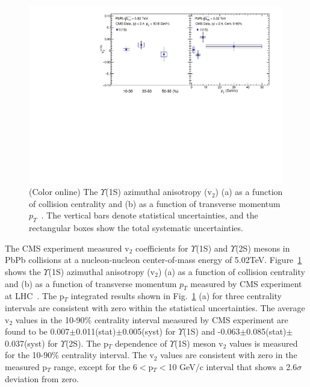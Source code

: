 \begin{figure}
\includegraphics[width=0.99\textwidth]{Figures/ExpOverview/Fig_CMS_Y1S_5TeV_V2.pdf}
\caption{(Color online) The $\Upsilon$(1S) azimuthal anisotropy (v$_{2}$) (a) as a function of collision centrality and 
  (b) as a function of transverse momentum $p_{T}$~\cite{CMS:2020efs}. The vertical bars denote statistical uncertainties,
  and the rectangular boxes show the total systematic uncertainties.
}
\label{fig:Upsilon1SV2CMS}
\end{figure}



The CMS experiment measured v$_{2}$ coefficients for $\Upsilon$(1S) and $\Upsilon$(2S) mesons in PbPb collisions
at a nucleon-nucleon center-of-mass energy of 5.02TeV. Figure~\ref{fig:Upsilon1SV2CMS} shows the $\Upsilon$(1S) azimuthal
anisotropy (v$_{2}$) (a) as a function of collision centrality and (b) as a function of transverse momentum $p_{T}$ measured
by CMS experiment at LHC~\cite{CMS:2020efs}. The p$_{T}$ integrated results
shown in Fig.~\ref{fig:Upsilon1SV2CMS} (a) for three centrality intervals are consistent with zero within the statistical
uncertainties. The average v$_{2}$ values in the 10-90$\%$ centrality interval measured by CMS experiment are found to
be 0.007$\pm$0.011(stat)$\pm$0.005(syst) for $\Upsilon$(1S) and -0.063$\pm$0.085(stat)$\pm$0.037(syst) for $\Upsilon$(2S).   
The p$_{T}$ dependence of $\Upsilon$(1S) meson v$_{2}$ values is measured for the 10-90$\%$ centrality interval.
The v$_{2}$ values are consistent with zero in the measured p$_T$ range, except for the 6$<$p$_{T}<$10 GeV/c interval that
shows a 2.6$\sigma$ deviation from zero. 

